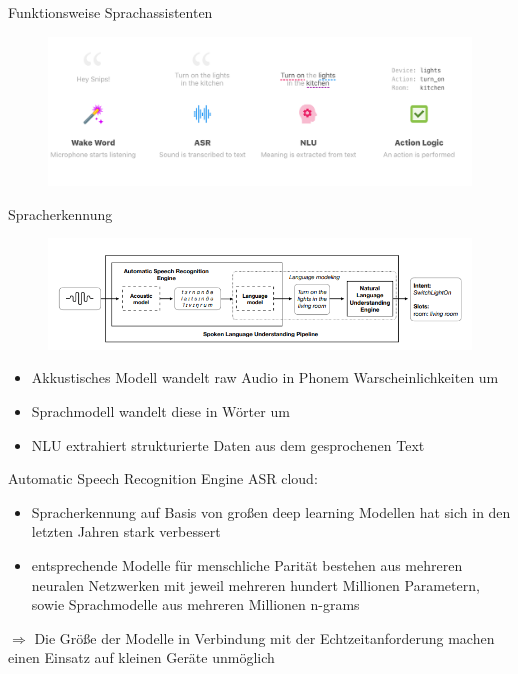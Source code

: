 \documentclass[aspectratio=169]{beamer}
\begin{document}
\begin{frame}{Funktionsweise Sprachassistenten}
	\begin{figure}
		\includegraphics[scale=0.22]{images/spoken-language-understanding2}
	\end{figure}
\end{frame}

\begin{frame}{Spracherkennung}
	\begin{figure}
		\includegraphics[scale=0.45]{images/spoken-language-understanding}
	\end{figure}
	\begin{itemize}
		\item Akkustisches Modell wandelt raw Audio in Phonem Warscheinlichkeiten um
		\item Sprachmodell wandelt diese in Wörter um
		\item NLU extrahiert strukturierte Daten aus dem gesprochenen Text
	\end{itemize}
\end{frame}

\begin{frame}{Automatic Speech Recognition Engine}
	ASR cloud:
	\begin{itemize}
		\item Spracherkennung auf Basis von großen deep learning Modellen hat sich in den letzten Jahren stark verbessert
		\item entsprechende Modelle für menschliche Parität bestehen aus mehreren neuralen Netzwerken mit jeweil mehreren hundert Millionen Parametern, sowie Sprachmodelle aus mehreren Millionen n-grams
	\end{itemize}
	$\Rightarrow$ Die Größe der Modelle in Verbindung mit der Echtzeitanforderung machen einen Einsatz auf kleinen Geräte unmöglich
\end{frame}
\end{document}
